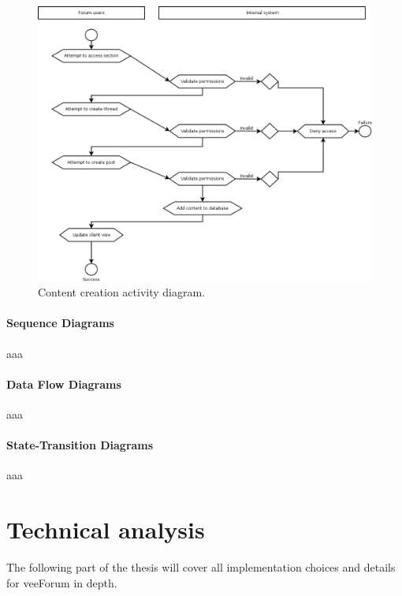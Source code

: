 \documentclass[12pt]{report}
\begin{document}
                    \begin{figure}[!htb]
                    \caption{Content creation activity diagram.}
                    \centering
                    \includegraphics[width=1\textwidth]{uc/a2}
                    \end{figure}

                    \newpage

                \subsection{Sequence Diagrams}
                    aaa

                \subsection{Data Flow Diagrams}
                    aaa

                \subsection{State-Transition Diagrams}
                    aaa

    \part{Technical analysis}
        The following part of the thesis will cover all implementation choices and details for veeForum in depth.
\end{document}
